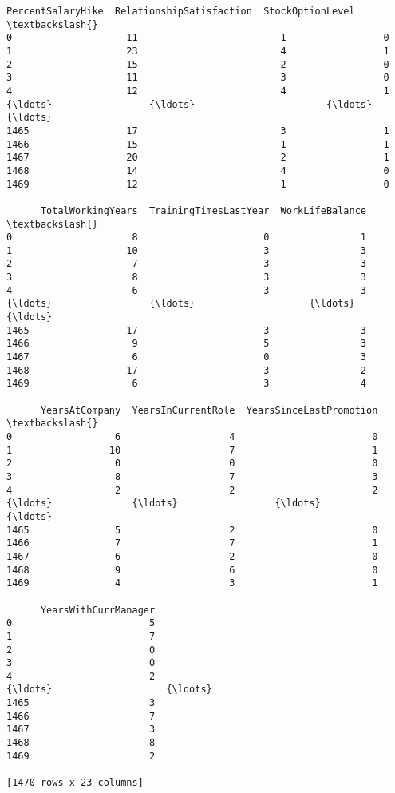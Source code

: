 \documentclass[11pt]{article}
\begin{document}
\begin{tcolorbox}[breakable, size=fbox, boxrule=.5pt, pad at break*=1mm, opacityfill=0]
\begin{Verbatim}[commandchars=\\\{\}]
      PercentSalaryHike  RelationshipSatisfaction  StockOptionLevel  \textbackslash{}
0                    11                         1                 0
1                    23                         4                 1
2                    15                         2                 0
3                    11                         3                 0
4                    12                         4                 1
{\ldots}                 {\ldots}                       {\ldots}               {\ldots}
1465                 17                         3                 1
1466                 15                         1                 1
1467                 20                         2                 1
1468                 14                         4                 0
1469                 12                         1                 0

      TotalWorkingYears  TrainingTimesLastYear  WorkLifeBalance  \textbackslash{}
0                     8                      0                1
1                    10                      3                3
2                     7                      3                3
3                     8                      3                3
4                     6                      3                3
{\ldots}                 {\ldots}                    {\ldots}              {\ldots}
1465                 17                      3                3
1466                  9                      5                3
1467                  6                      0                3
1468                 17                      3                2
1469                  6                      3                4

      YearsAtCompany  YearsInCurrentRole  YearsSinceLastPromotion  \textbackslash{}
0                  6                   4                        0
1                 10                   7                        1
2                  0                   0                        0
3                  8                   7                        3
4                  2                   2                        2
{\ldots}              {\ldots}                 {\ldots}                      {\ldots}
1465               5                   2                        0
1466               7                   7                        1
1467               6                   2                        0
1468               9                   6                        0
1469               4                   3                        1

      YearsWithCurrManager
0                        5
1                        7
2                        0
3                        0
4                        2
{\ldots}                    {\ldots}
1465                     3
1466                     7
1467                     3
1468                     8
1469                     2

[1470 rows x 23 columns]
\end{Verbatim}
\end{tcolorbox}
        
\end{document}
